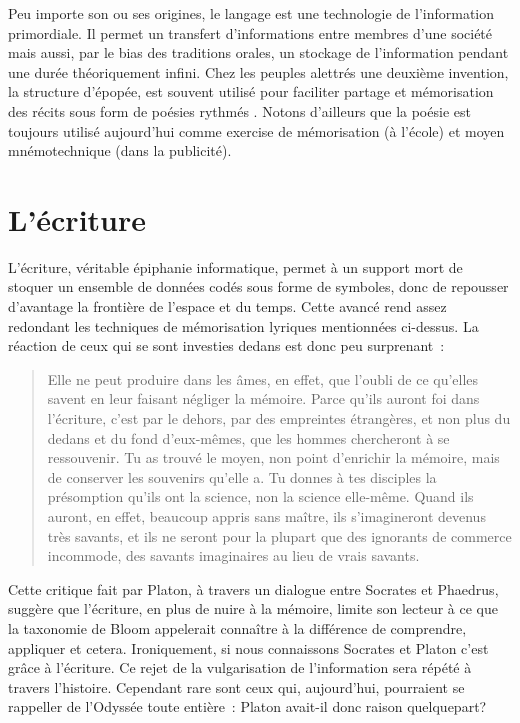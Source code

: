 Peu importe son ou ses origines, le langage est une technologie de l'information primordiale. Il permet un transfert d'informations entre membres d'une société mais aussi, par le bias des traditions orales, un stockage de l'information pendant une durée théoriquement infini. Chez les peuples alettrés une deuxième invention, la structure d'épopée, est souvent utilisé pour faciliter partage et mémorisation des récits sous form de poésies rythmés \cite{havelock-preface-plato}. Notons d'ailleurs que la poésie est toujours utilisé aujourd'hui comme exercise de mémorisation (à l'école) et moyen mnémotechnique (dans la publicité).

\section{L'écriture}
L'écriture, véritable épiphanie informatique, permet à un support mort de stoquer un ensemble de données codés sous forme de symboles, donc de repousser d'avantage la frontière de l'espace et du temps. Cette avancé rend assez redondant les techniques de mémorisation lyriques mentionnées ci-dessus. La réaction de ceux qui se sont investies dedans est donc peu surprenant~:
\begin{quote}
Elle ne peut produire dans les âmes, en effet, que l’oubli de ce qu’elles  savent en leur faisant négliger la mémoire. Parce qu’ils auront foi dans  l’écriture, c’est par le dehors, par des empreintes étrangères, et non plus du dedans et du fond d’eux-mêmes, que les hommes chercheront à se ressouvenir. Tu as trouvé le moyen, non point d’enrichir la mémoire, mais de conserver les souvenirs qu’elle a. Tu donnes à tes disciples la présomption qu’ils ont la science, non la science elle-même. Quand ils auront, en effet, beaucoup appris sans maître, ils s’imagineront devenus très savants, et ils ne seront pour la plupart que des ignorants de commerce incommode, des savants imaginaires au lieu de vrais savants.
\end{quote}
Cette critique fait par Platon\cite{plato-phaedrus}, à travers un dialogue entre Socrates et Phaedrus, suggère que l'écriture, en plus de nuire à la mémoire, limite son lecteur à ce que la taxonomie de Bloom\cite{tax-bloom} appelerait \og{}connaître\fg{} à la différence de \og{}comprendre\fg{}, \og{}appliquer\fg{} et cetera.
Ironiquement, si nous connaissons Socrates et Platon c'est grâce à l'écriture. Ce rejet de la vulgarisation de l'information sera répété à travers l'histoire. Cependant rare sont ceux qui, aujourd'hui, pourraient se rappeller de l'Odyssée toute entière~: Platon avait-il donc raison quelquepart? 

